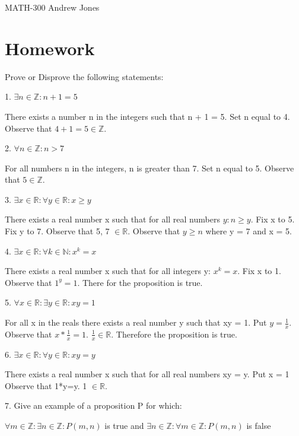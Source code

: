 \documentclass{article}
\begin{document}
  MATH-300 \hfill Andrew Jones
  \centering
  \section{Homework}
  Prove or Disprove the following statements: \newline
  \newline
  \raggedright
  1. $\exists n \in \mathbb{Z}: n + 1 = 5$
  \begin{flushleft}
    There exists a number n in the integers such that n + 1 = 5.
    Set n equal to 4.
    Observe that $4 + 1 = 5 \in \mathbb{Z}$.
  \end{flushleft}
  2. $\forall n \in \mathbb{Z}: n > 7$
  \begin{flushleft}
    For all numbers n in the integers, n is greater than 7.
    Set n equal to 5.
    Observe that $5 \in \mathbb{Z}$.
  \end{flushleft}
  3. $\exists x \in \mathbb{R}: \forall y \in \mathbb{R}: x \geq y$
  \begin{flushleft}
    There exists a real number x such that for all real numbers $y: n \geq y$.
    Fix x to 5.
    Fix y to 7.
    Observe that 5, 7 $\in \mathbb{R}$.
    Observe that $y \ge n $ where y = 7 and x = 5.
  \end{flushleft}
  4. $\exists x \in \mathbb{R}: \forall k \in \mathbb{N}: x^k = x$ 
  \begin{flushleft}
    There exists a real number x such that for all integers y: $x^k = x$. 
    Fix x to 1.
    Observe that $1^y = 1$.
    There for the proposition is true.
  \end{flushleft}
  5. $\forall x \in \mathbb{R}: \exists y \in \mathbb{R}: xy = 1$
  \begin{flushleft}
    For all x in the reals there exists a real number y such that xy = 1.
    Put $y = \frac{1}{x}$.
    Observe that $x * \frac{1}{x} = 1$.
    $\frac{1}{x} \in \mathbb{R}$.
    Therefore the proposition is true.
  \end{flushleft}
  6. $\exists x \in \mathbb{R}: \forall y \in \mathbb{R}: xy = y$
  \begin{flushleft}
    There exists a real number x such that for all real numbers xy = y. Put x = 1
    Observe that 1*y=y. 1 $\in \mathbb{R}$.
  \end{flushleft}
  7. Give an example of a proposition P for which:
  \begin{center}
  $\forall m \in \mathbb{Z}: \exists n \in \mathbb{Z}: P(m,n)$ is true
  and
  $\exists n \in \mathbb{Z}: \forall m \in \mathbb{Z}: P(m,n)$ is false
  \end{center}
\end{document}
